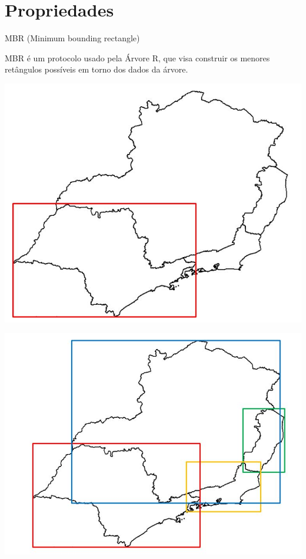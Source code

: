 \documentclass[compress,aspectratio=169]{beamer}
\begin{document}
\section{Propriedades}
\begin{frame}{MBR (Minimum bounding rectangle)}
    \begin{justify}
        MBR é um protocolo usado pela Árvore R, que visa construir os menores retângulos possíveis em torno dos dados da árvore.

        \begin{minipage}{0.45\linewidth}
            \centering
            \includegraphics[width=\linewidth]{mbr.JPG}
            
        \end{minipage}
        \hfill
        \begin{minipage}{0.45\linewidth}
            \centering
            \includegraphics[width=\linewidth]{mbr2.JPG}
            
        \end{minipage}
    \end{justify}
\end{frame}
\end{document}
